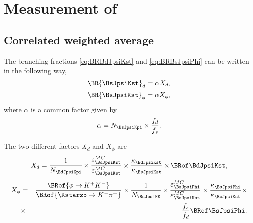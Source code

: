 \afterpage{\blankpage}
\cleardoublepage
\chapter{Measurement of \BRof\BsJpsiKst}\label{app:BsJpsiKst_branching}
\section{Correlated weighted average}\label{app:BsJpsiKst_branching_av}
The branching fractions \eqref{eq:BRBdJpsiKst} and \eqref{eq:BRBsJpsiPhi} can be written in the following way,
\begin{equation}
\BR{\BsJpsiKst}_{d} = \alpha X_d,
\end{equation}
\begin{equation}
\BR{\BsJpsiKst}_{\phi} = \alpha X_\phi,
\end{equation}
where $\alpha$ is a common factor given by
\begin{equation}
\alpha = N_{\BsJpsiKpi} \times \frac{f_d}{f_s}.%
\end{equation}
%

The two different factors $X_d$ and $X_\phi$ are %
\begin{equation}
X_d = \frac{1}{N_{\BdJpsiKpi}} \times \frac{\varepsilon_{\BdJpsiKst}^{MC}}{\varepsilon_{\BsJpsiKst}^{MC}} \times \frac{\kappa_{\BdJpsiKst}}{\kappa_{\BsJpsiKst}} \times \BRof\BdJpsiKst,
\end{equation}
\begin{eqnarray}
X_\phi &=& \frac{\BRof{\phi\to K^+K^-}}{\BRof{\Kstarzb\to K^-\pi^+}} \times \frac{1}{N_{\BsJpsiKK}} \times \frac{\varepsilon_{\BsJpsiPhi}^{MC}}{\varepsilon_{\BsJpsiKst}^{MC}} \times \frac{\kappa_{\BsJpsiPhi}}{\kappa_{\BsJpsiKst}} \times \nonumber\\
&\times& \frac{f_s}{f_d}\BRof\BsJpsiPhi.
\end{eqnarray}
%

